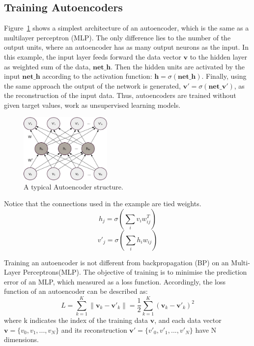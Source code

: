 \documentclass{article}
\begin{document}
\subsection{Training Autoencoders}
Figure~\ref{fig:AE} shows a simplest architecture of an autoencoder, which is the same as a multilayer perceptron (MLP).
The only difference lies to the number of the output units, where an autoencoder has as many output neurons as the input.
In this example, the input layer feeds forward the data vector $\mathbf{v}$ to the hidden layer as weighted sum of the data, $\mathbf{net\_h}$.
Then the hidden units are activated by the input $\mathbf{net\_h}$ according to the activation function: $\mathbf{h}=\sigma(\mathbf{net\_h})$.
Finally, using the same approach the output of the network is generated, $\mathbf{v'}=\sigma(\mathbf{net\_v'})$, as the reconstruction of the input data.
Thus, autoencoders are trained without given target values, work as unsupervised learning models.	
\begin{figure}
	\centering
	\includegraphics[width=0.4\textwidth]{AE}
	\caption{A typical Autoencoder structure.}
	\label{fig:AE}
\end{figure}

Notice that the connections used in the example are tied weights.
\begin{equation}
h_j=\sigma(\sum_i v_i w^T_{ij})
\end{equation}
\begin{equation}
v'_j=\sigma(\sum_i h_i w_{ij})
\end{equation}

Training an autoencoder is not different from backpropagation (BP) on an Multi-Layer Perceptrons(MLP).
The objective of training is to minimise the prediction error of an MLP, which measured as a loss function.
Accordingly, the loss function of an autoencoder can be described as:
\begin{equation}
L=\sum_{k=1}^{K}\|\mathbf{v}_{k}-\mathbf{v'}_{k}\|=\frac{1}{2}\sum_{k=1}^{K}(\mathbf{v}_{k}-\mathbf{v'}_{k})^{2}
\end{equation}
where k indicates the index of the training data $\mathbf{v}$, and each data vector $\mathbf{v}=\{v_0, v_1,...,v_N\}$ and its reconstruction $\mathbf{v'}=\{v'_0, v'_1,...,v'_N\}$ have N dimensions. 
\end{document}
